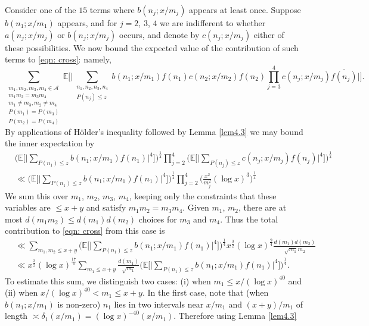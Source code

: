 \documentclass[12pt, notitlepage]{amsart}
\numberwithin{equation}{section}
\def\E{\mathbb E}
\def\CA{\mathcal{A}}
\theoremstyle{remark}
\theoremstyle{definition}
\theoremstyle{remark}
\numberwithin{equation}{section}
\begin{document}
Consider one of the $15$ terms where $b(n_j;x/m_j)$ appears at least once.  Suppose $b(n_1;x/m_1)$ appears, and for $j=2$, $3$, $4$ we are indifferent to whether $a(n_j;x/m_j)$ or $b(n_j;x/m_j)$ occurs, and denote by $c(n_j;x/m_j)$ either of these possibilities.  We now bound the expected value of the contribution of such terms to \eqref{eqn: cross}: namely, 
$$
\sum_{\substack{ m_1, m_2, m_3, m_4 \in \CA \\ m_1 m_2= m_3 m_4 \\ m_1 \neq m_3, m_2\neq m_4 \\ P(m_1)=P(m_3) \\ P(m_2)=P(m_4)}}  
\E \Big[ \Big| \sum_{\substack{ n_1, n_2, n_3, n_4 \\ P(n_j) \le z}}  b(n_1;x/m_1) f(n_1) c(n_2;x/m_2) f(n_2) \prod_{j=3}^{4} c(n_j; x/m_j) \overline{f(n_j)}\Big|\Big]. 
$$ 
By applications of H{\" o}lder's inequality followed by Lemma \ref{lem4.3} we may bound the inner expectation by 
\begin{align*}
&\Big( \E \Big[ \Big| \sum_{P(n_1)\le z} b(n_1;x/m_1) f(n_1)\Big|^4\Big]\Big)^{\frac 14} \prod_{j=2}^{4} \Big(\E \Big[ \Big| \sum_{P(n_j) \le z} c(n_j;x/m_j) f(n_j)\Big|^4 \Big] \Big)^{\frac 14} \\
&\ll \Big( \E \Big[ \Big| \sum_{P(n_1)\le z} b(n_1;x/m_1) f(n_1)\Big|^4\Big]\Big)^{\frac 14} \prod_{j=2}^{4} \Big( \frac{x^2}{m_j^2} (\log x)^3 \Big)^{\frac 14}
\end{align*} 
We sum this over $m_1$, $m_2$, $m_3$, $m_4$, keeping only the constraints that these variables are $\le x+y$ and satisfy $m_1 m_2 = m_3 m_4$.  Given $m_1$, $m_2$, there are 
at most $d(m_1 m_2) \le d(m_1) d(m_2)$ choices for $m_3$ and $m_4$.   Thus the total contribution to \eqref{eqn: cross} from this case is 
\begin{align*}
&\ll \sum_{m_1, m_2  \le x+y} \Big( \E \Big[ \Big| \sum_{P(n_1)\le z} b(n_1;x/m_1) f(n_1)\Big|^4\Big]\Big)^{\frac 14} x^{\frac 32} (\log x)^{\frac 94} \frac{d(m_1)d(m_2)}{\sqrt{m_1} m_2}  \\
&\ll x^{\frac 32} (\log x)^{\frac {17}{4}} \sum_{m_1 \le x+y} \frac{d(m_1)}{\sqrt{m_1}} \Big( \E \Big[ \Big| \sum_{P(n_1)\le z} b(n_1;x/m_1) f(n_1)\Big|^4\Big]\Big)^{\frac 14}.
\end{align*}
To estimate this sum, we distinguish two cases: (i) when $m_1 \le x/(\log x)^{40}$ and (ii) when $x/(\log x)^{40} < m_1 \le x+y$.   In the first case, note that (when $b(n_1;x/m_1)$ is non-zero) $n_1$ lies in two intervals near $x/m_1$ and $(x+y)/m_1$ of length $\asymp \delta_1 (x/m_1) = (\log x)^{-40}(x/m_1)$.   Therefore using Lemma \ref{lem4.3} 
\end{document}
